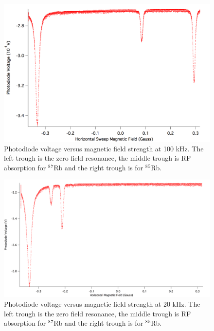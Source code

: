 \documentclass[prb,preprint]{revtex4-1}
\begin{document}
\begin{figure}[h]
\centering
\includegraphics[width=16cm]{100kHz.png}
\caption{Photodiode voltage versus magnetic field strength at 100 kHz. The left trough is the zero field resonance, the middle trough is RF absorption for $^8$$^7$Rb and the right trough is for $^8$$^5$Rb.}
\label{100kHz}
\end{figure}


\begin{figure}[h]
\centering
\includegraphics[width=16cm]{20kHz.png}
\caption{Photodiode voltage versus magnetic field strength at 20 kHz. The left trough is the zero field resonance, the middle trough is RF absorption for $^8$$^7$Rb and the right trough is for $^8$$^5$Rb.}
\label{20kHz}
\end{figure}
\end{document}
